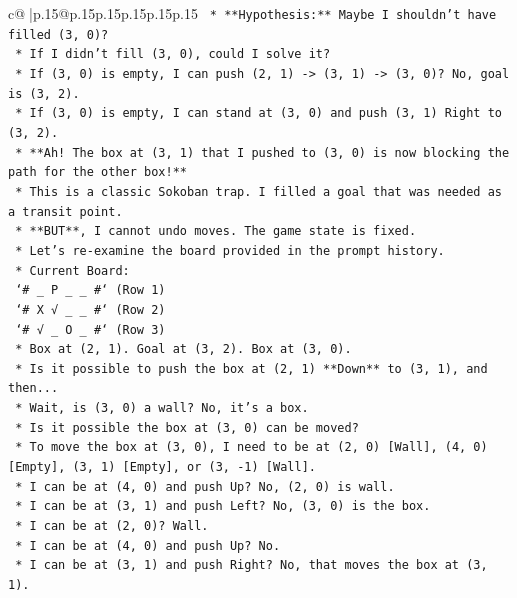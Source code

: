 \documentclass{article}
\begin{document}
{\begin{supertabular}{c@{$\;$}|p{.15\linewidth}@{}p{.15\linewidth}p{.15\linewidth}p{.15\linewidth}p{.15\linewidth}p{.15\linewidth}}
{{{\texttt{        *   **Hypothesis:** Maybe I shouldn't have filled (3, 0)?} \\
\texttt{        *   If I didn't fill (3, 0), could I solve it?} \\
\texttt{        *   If (3, 0) is empty, I can push (2, 1) {-}> (3, 1) {-}> (3, 0)? No, goal is (3, 2).} \\
\texttt{        *   If (3, 0) is empty, I can stand at (3, 0) and push (3, 1) Right to (3, 2).} \\
\texttt{        *   **Ah! The box at (3, 1) that I pushed to (3, 0) is now blocking the path for the other box!**} \\
\texttt{        *   This is a classic Sokoban trap. I filled a goal that was needed as a transit point.} \\
\texttt{        *   **BUT**, I cannot undo moves. The game state is fixed.} \\
\texttt{        *   Let's re{-}examine the board provided in the prompt history.} \\
\texttt{        *   Current Board:} \\
\texttt{            `\# \_ P \_ \_ \#` (Row 1)} \\
\texttt{            `\# X √ \_ \_ \#` (Row 2)} \\
\texttt{            `\# √ \_ O \_ \#` (Row 3)} \\
\texttt{        *   Box at (2, 1). Goal at (3, 2). Box at (3, 0).} \\
\texttt{        *   Is it possible to push the box at (2, 1) **Down** to (3, 1), and then...} \\
\texttt{        *   Wait, is (3, 0) a wall? No, it's a box.} \\
\texttt{        *   Is it possible the box at (3, 0) can be moved?} \\
\texttt{        *   To move the box at (3, 0), I need to be at (2, 0) {[}Wall{]}, (4, 0) {[}Empty{]}, (3, 1) {[}Empty{]}, or (3, {-}1) {[}Wall{]}.} \\
\texttt{        *   I can be at (4, 0) and push Up? No, (2, 0) is wall.} \\
\texttt{        *   I can be at (3, 1) and push Left? No, (3, 0) is the box.} \\
\texttt{        *   I can be at (2, 0)? Wall.} \\
\texttt{        *   I can be at (4, 0) and push Up? No.} \\
\texttt{        *   I can be at (3, 1) and push Right? No, that moves the box at (3, 1).} \\
}}}
\end{supertabular}}
\end{document}
